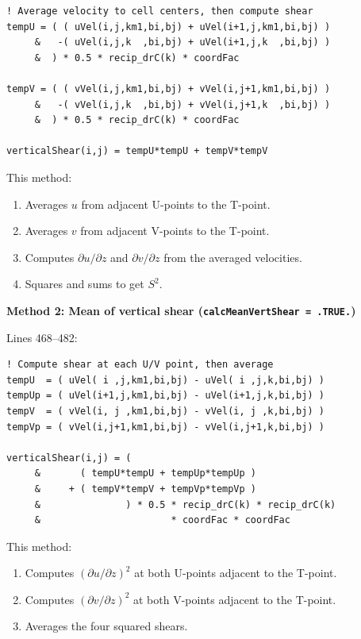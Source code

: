 \documentclass[12pt,letterpaper]{article}
\begin{document}
\begin{lstlisting}[caption={\texttt{ggl90\_calc.F}, lines 484--498 -- Shear of mean velocity.}]
! Average velocity to cell centers, then compute shear
tempU = ( ( uVel(i,j,km1,bi,bj) + uVel(i+1,j,km1,bi,bj) )
     &   -( uVel(i,j,k  ,bi,bj) + uVel(i+1,j,k  ,bi,bj) )
     &  ) * 0.5 * recip_drC(k) * coordFac

tempV = ( ( vVel(i,j,km1,bi,bj) + vVel(i,j+1,km1,bi,bj) )
     &   -( vVel(i,j,k  ,bi,bj) + vVel(i,j+1,k  ,bi,bj) )
     &  ) * 0.5 * recip_drC(k) * coordFac

verticalShear(i,j) = tempU*tempU + tempV*tempV
\end{lstlisting}

This method:
\begin{enumerate}[label=\textbf{\arabic*.}]
  \item Averages $u$ from adjacent U-points to the T-point.
  \item Averages $v$ from adjacent V-points to the T-point.
  \item Computes $\partial u/\partial z$ and $\partial v/\partial z$ from the
        averaged velocities.
  \item Squares and sums to get $S^2$.
\end{enumerate}

\textbf{Method 2: Mean of vertical shear (\texttt{calcMeanVertShear = .TRUE.})}

Lines 468--482:

\begin{lstlisting}[caption={\texttt{ggl90\_calc.F}, lines 468--482 -- Mean of shear components.}]
! Compute shear at each U/V point, then average
tempU  = ( uVel( i ,j,km1,bi,bj) - uVel( i ,j,k,bi,bj) )
tempUp = ( uVel(i+1,j,km1,bi,bj) - uVel(i+1,j,k,bi,bj) )
tempV  = ( vVel(i, j ,km1,bi,bj) - vVel(i, j ,k,bi,bj) )
tempVp = ( vVel(i,j+1,km1,bi,bj) - vVel(i,j+1,k,bi,bj) )

verticalShear(i,j) = (
     &       ( tempU*tempU + tempUp*tempUp )
     &     + ( tempV*tempV + tempVp*tempVp )
     &               ) * 0.5 * recip_drC(k) * recip_drC(k)
     &                       * coordFac * coordFac
\end{lstlisting}

This method:
\begin{enumerate}[label=\textbf{\arabic*.}]
  \item Computes $(\partial u/\partial z)^2$ at both U-points adjacent to the
        T-point.
  \item Computes $(\partial v/\partial z)^2$ at both V-points adjacent to the
        T-point.
  \item Averages the four squared shears.
\end{enumerate}
\end{document}
